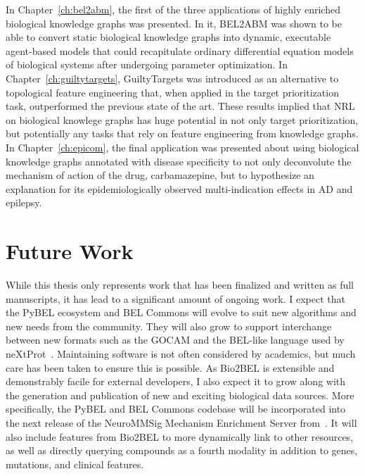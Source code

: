 In Chapter~\ref{ch:bel2abm}, the first of the three applications of highly enriched biological knowledge graphs was presented.
In it, BEL2ABM was shown to be able to convert static biological knowledge graphs into dynamic, executable agent-based models that could recapitulate ordinary differential equation models of biological systems after undergoing parameter optimization.
In Chapter~\ref{ch:guiltytargets}, GuiltyTargets was introduced as an alternative to topological feature engineering that, when applied in the target prioritization task, outperformed the previous state of the art.
These results implied that \ac{NRL} on biological knowlege graphs has huge potential in not only target prioritization, but potentially any tasks that rely on feature engineering from knowledge graphs.
In Chapter~\ref{ch:epicom}, the final application was presented about using biological knowledge graphs annotated with disease specificity to not only deconvolute the mechanism of action of the drug, carbamazepine, but to hypothesize an explanation for its epidemiologically observed multi-indication effects in \ac{AD} and epilepsy.

\section{Future Work}

While this thesis only represents work that has been finalized and written as full manuscripts, it has lead to a significant amount of ongoing work.
I expect that the PyBEL ecosystem and BEL Commons will evolve to suit new algorithms and new needs from the community.
They will also grow to support interchange between new formats such as the \ac{GOCAM} and the \ac{BEL}-like language used by neXtProt~\cite{Gaudet2017}.
Maintaining software is not often considered by academics, but much care has been taken to ensure this is possible.
As Bio2BEL is extensible and demonstrably facile for external developers, I also expect it to grow along with the generation and publication of new and exciting biological data sources.
More specifically, the PyBEL and BEL Commons codebase will be incorporated into the next release of the NeuroMMSig Mechanism Enrichment Server from~\cite{Domingo-Fernandez2017}.
It will also include features from Bio2BEL to more dynamically link to other resources, as well as directly querying compounds as a fourth modality in addition to genes, mutations, and clinical features.

